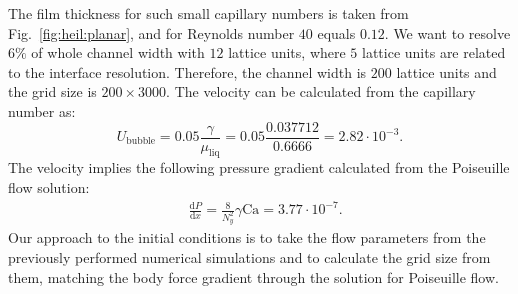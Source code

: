 \documentclass[preprint,12pt]{elsarticle}
\newcommand{\Ca}{\mathrm{Ca}}
\begin{document}
\begin{description}
  The film thickness for such small capillary numbers is taken from Fig.~\ref{fig:heil:planar},
  and for Reynolds number $40$ equals $0.12$. We want to
  resolve $6\%$ of whole channel width with $12$ lattice units, where $5$
lattice units are related to the interface resolution.  Therefore, the channel
  width is $200$ lattice units and the grid size is $200 \times 3000$. The velocity can be
calculated from the capillary number as:
  \begin{equation}
  U_{\mathrm{bubble}}=0.05 \frac{\gamma}{\mu_{\mathrm{liq}}}=0.05 \frac{0.037712}{0.6666}=2.82\cdot
  10^{-3}.
  \end{equation}
  The velocity implies the following pressure gradient calculated from the
  Poiseuille flow solution:
  \begin{equation}
  \begin{aligned}
  &\frac{\mathrm{d}P}{\mathrm{d}x}=\frac{8}{N_y^2}\gamma \Ca=3.77\cdot10^{-7}.
  \end{aligned}
  \end{equation}
  Our approach to the initial conditions is  to take the flow parameters from the previously
performed
numerical simulations and to calculate the grid size from them, matching the
body force gradient through the solution for Poiseuille flow.

\end{description}
\end{document}
